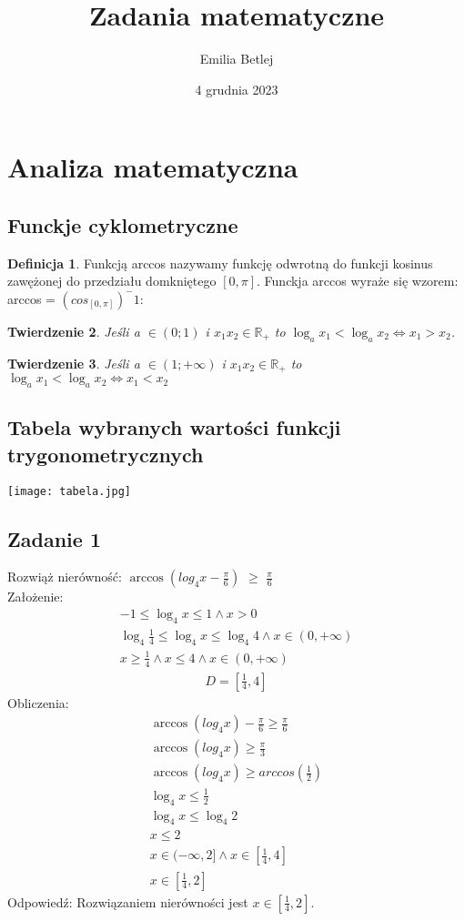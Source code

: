 \documentclass[10pt]{mwart}
\title{Zadania matematyczne}
\author{Emilia Betlej}
\date{4 grudnia 2023}
\newcommand{\RR}{{\mathbb R}}
\theoremstyle{plain} \newtheorem{tw}{Twierdzenie}[section]
\theoremstyle{plain} \newtheorem{lem}[tw]{Lemat}
\theoremstyle{definition} \newtheorem{df}[tw]{Definicja}
\begin{document}
\maketitle
\tableofcontents
\section{Analiza matematyczna}
\subsection{Funckje cyklometryczne}
\begin{df}
    Funkcją arccos nazywamy funkcję odwrotną do funkcji kosinus zawężonej do przedziału domkniętego \([0, \pi]\). Funckja arccos wyraże się wzorem: arccos = \((cos_{[0, \pi]})^-1\)\cite{odnośnik3}:
\end{df}
\begin{tw}
   Jeśli a \(\in (0; 1)\) i \(x_1x_2\in \RR_+\) to \(\log_a{x_1} < \log_a{x_2}\iff x_1>x_2\).
\end{tw}
\begin{tw}
   Jeśli a \(\in (1; +\infty)\) i \(x_1x_2\in \RR_+\) to \(\log_a{x_1} < \log_a{x_2}\iff x_1<x_2\)
\end{tw}
\subsection{Tabela wybranych wartości funkcji trygonometrycznych}
\texttt{[image: tabela.jpg]}
\subsection{Zadanie 1}
Rozwiąż nierówność: \(\arccos({log_4{x}-\frac{\pi}{6}})\) \(\geq\) \(\frac{\pi}{6}\)\\
Założenie: \begin{align*}
-1\leq\log_4{x}\leq1 \wedge x > 0\\
\log_4{\frac{1}{4}}\leq\log_4{x}\leq\log_4{4} \wedge x\in(0, +\infty)\\
x\geq\frac{1}{4} \wedge x\leq4 \wedge x\in(0, +\infty)\end{align*}
 \begin{align*}D = [\frac{1}{4}, 4]\end{align*} Obliczenia:
\begin{align}
\arccos(log_4{x})-\frac{\pi}{6}\geq \frac{\pi}{6}\\
\arccos(log_4{x})\geq \frac{\pi}{3}\\
\arccos(log_4{x})\geq arccos(\frac{1}{2})\\
\log_4{x}\leq \frac{1}{2}\\
\log_4{x}\leq \log_4{2}\\
x \leq 2\\
x \in (-\infty, 2] \wedge x\in[\frac{1}{4}, 4]\\
x\in [\frac{1}{4}, 2]
\end{align}
Odpowiedź: Rozwiązaniem nierówności jest \(x\in [\frac{1}{4}, 2]\).
\end{document}
